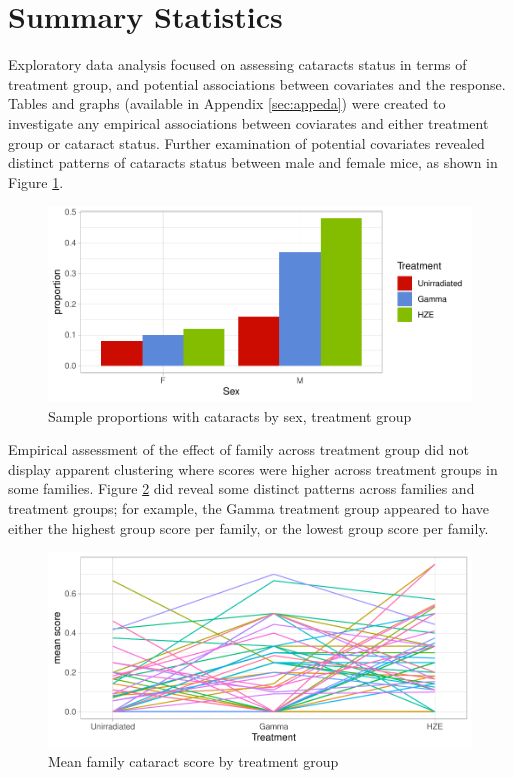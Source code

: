 \documentclass[12pt]{article}
\begin{document}
\section{Summary Statistics}
\label{sec:sumstats}

Exploratory data analysis focused on assessing cataracts status in terms of treatment group, and potential associations between covariates and the response. Tables and graphs (available in Appendix \ref{sec:appeda}) were created to investigate any empirical associations between coviarates and either treatment group or cataract status. Further examination of potential covariates revealed distinct patterns of cataracts status between male and female mice, as shown in Figure \ref{fig:bareda}.\\

\begin{figure}[H]

{\centering \includegraphics{bookdown_report_files/figure-latex/bareda-1} 

}

\caption{Sample proportions with cataracts by sex, treatment group}\label{fig:bareda}
\end{figure}

Empirical assessment of the effect of family across treatment group did not display apparent clustering where scores were higher across treatment groups in some families. Figure \ref{fig:lineeda} did reveal some distinct patterns across families and treatment groups; for example, the Gamma treatment group appeared to have either the highest group score per family, or the lowest group score per family.\\

\begin{figure}[H]

{\centering \includegraphics{bookdown_report_files/figure-latex/lineeda-1} 

}

\caption{Mean family cataract score by treatment group}\label{fig:lineeda}
\end{figure}
\end{document}
